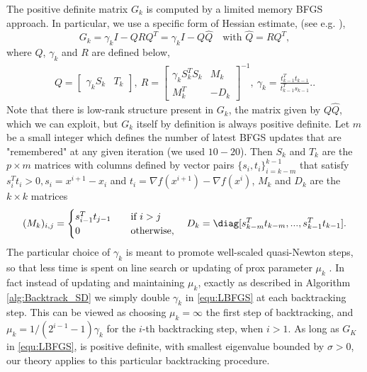 \documentclass[11pt]{article}
\numberwithin{equation}{section}
\begin{document}
The positive definite matrix $G_k$ is computed by a limited memory BFGS approach. In particular,
 we use a  specific form of Hessian estimate, (see e.g. \cite{Byrd1994,NoceWrig06}),
\begin{equation}
    \label{equ:LBFGS}
    G_k = \gamma_k I - QRQ^T = \gamma_k I - Q\hat Q \quad \mbox{with  } \hat Q= RQ^T,
\end{equation}
where $Q$, $\gamma_k$ and $R$ are defined below,
\begin{align}
    Q = 
    \begin{bmatrix}
        \gamma_kS_k &T_k
    \end{bmatrix}, ~
    R = 
    \begin{bmatrix}
        \gamma_kS_k^TS_k &M_k\\
        M_k^T   &-D_k
    \end{bmatrix}^{-1}, ~
    \gamma_k = \frac{t^T_{k-1}t_{k-1}}{t^T_{k-1}s_{k-1}}.   .
\end{align}
Note that there is low-rank structure present in $G_k$, the matrix given by $Q \hat Q$, which we can exploit, but $G_k$ itself by definition is always positive definite. 
Let $m$ be a small integer which defines the number of latest
BFGS updates that are "remembered" at any given iteration (we used $10-20$).
Then $S_k$ and $T_k$ are the $p \times m$ matrices with columns defined by  vector pairs $\{s_i,t_i\}_{i=k-m}^{k-1}$ that satisfy $s_i^Tt_i > 0, s_i = x^{i+1} - x_i$ and $t_i = \nabla f(x^{i+1}) - \nabla f(x^{i}) $, 
 $M_k$ and $D_k$ are the $k \times k$ matrices
    \begin{equation*}
        (M_k)_{i,j} = 
        \begin{cases}
            s_{i-1}^Tt_{j-1} \quad &\mbox{if }i > j \\
            0   \quad &\mbox{otherwise,}
        \end{cases} \quad D_k = \diag[s^T_{k-m}t_{k-m},...,s_{k-1}^Tt_{k-1}].
    \end{equation*}
 The particular choice of $\gamma_k$ is meant  to promote   well-scaled quasi-Newton steps, so that less time is spent on line search or updating of prox parameter $\mu_k$ \cite{NoceWrig06}. In fact instead of updating and maintaining $\mu_k$, exactly as described in Algorithm \ref{alg:Backtrack_SD}  we simply
 double $\gamma_k$ in \eqref{equ:LBFGS} at each backtracking step. This can be viewed as choosing   $\mu_k=\infty$ the first step of backtracking, and $\mu_k=1/(2^{i-1}-1)\gamma_k$ for the $i$-th backtracking step, when $i>1$. As long as $G_K$ in \eqref{equ:LBFGS}, is positive definite, with smallest eigenvalue bounded by $\sigma>0$, our theory applies to this particular backtracking procedure. 
\end{document}
